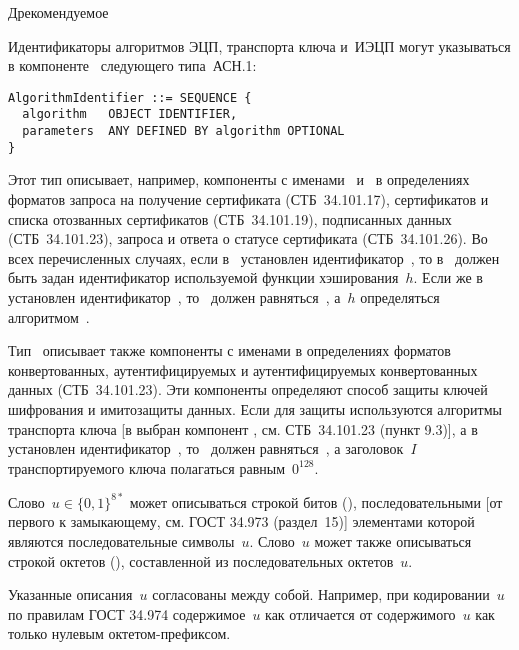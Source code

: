 \begin{appendix}{Д}{рекомендуемое}
\label{ASN.Params}

Идентификаторы алгоритмов ЭЦП, транспорта ключа и~ИЭЦП могут 
указываться в компоненте~ следующего типа~АСН.1:
\begin{verbatim}
AlgorithmIdentifier ::= SEQUENCE {
  algorithm   OBJECT IDENTIFIER,
  parameters  ANY DEFINED BY algorithm OPTIONAL
}
\end{verbatim}

Этот тип описывает, например, 
компоненты с именами~ 
и~ в определениях форматов
запроса на получение сертификата (СТБ~34.101.17),
сертификатов и списка отозванных сертификатов (СТБ~34.101.19), 
подписанных данных (СТБ~34.101.23),
запроса и ответа о статусе сертификата (СТБ~34.101.26).
%
Во всех перечисленных случаях, если в~ установлен
идентификатор~, то в~ 
должен быть задан идентификатор используемой функции хэширования~$h$. 
%
Если же в~ установлен 
идентификатор~,
то~ должен равняться~,
а~$h$ определяться алгоритмом~.

Тип~ описывает также компоненты 
с именами  в определениях форматов
конвертованных, аутентифицируемых и аутентифицируемых 
конвертованных данных (СТБ~34.101.23). 
Эти компоненты определяют способ защиты
ключей шифрования и имитозащиты данных. 
%
Если для защиты используются алгоритмы транспорта ключа
[в  выбран компонент , 
см. СТБ~34.101.23 (пункт 9.3)],
а в~ установлен идентификатор~,
то~ должен равняться~,
а заголовок~$I$ транспортируемого ключа полагаться равным~$0^{128}$.

\label{ASN.Words}

Слово~$u\in\{0,1\}^{8*}$ может описываться строкой битов
(), последовательными 
[от первого к замыкающему, см. ГОСТ 34.973 (раздел~15)]
элементами которой являются последовательные символы~$u$.
%
Слово~$u$ может также описываться строкой октетов 
(), составленной из последовательных 
октетов~$u$.

Указанные описания~$u$ согласованы между собой. 
Например, при кодировании~$u$ по правилам ГОСТ 34.974 
содержимое~$u$ как  отличается
от содержимого~$u$ как~ 
только нулевым октетом-префиксом.


\end{appendix}
